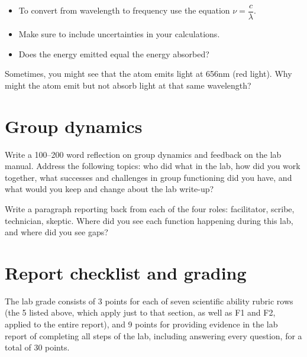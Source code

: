 \begin{steps}
\begin{itemize}
		\item To convert from wavelength to frequency use the equation $\nu = \dfrac{c}{\lambda}$. 
		
		\item Make sure to include uncertainties in your calculations.
		
		\item Does the energy emitted equal the energy absorbed? 
	\end{itemize}
	
	\item Sometimes, you might see that the atom emits light at 656nm (red light). Why might the atom emit but not absorb light at that same wavelength? 
\end{steps}

\section{Group dynamics}

\begin{steps}
	\item Write a 100--200 word reflection on group dynamics and feedback on the lab manual. Address the following topics: who did what in the lab, how did you work together, what successes and challenges in group functioning did you have, and what would you keep and change about the lab write-up?
	
	\item Write a paragraph reporting back from each of the four roles: facilitator, scribe, technician, skeptic. Where did you see each function happening during this lab, and where did you see gaps?
\end{steps}

\section{Report checklist and grading}

The lab grade consists of 3 points for each of seven scientific ability rubric rows (the 5 listed above, which apply just to that section, as well as F1 and F2, applied to the entire report), and 9 points for providing evidence in the lab report of completing all steps of the lab, including answering every question, for a total of 30 points.
